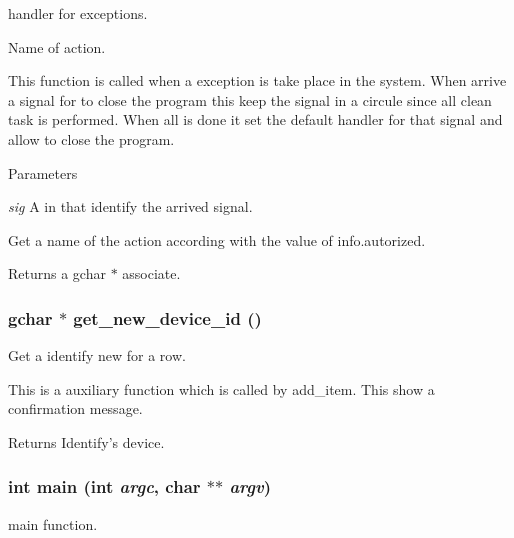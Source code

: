 handler for exceptions. 

Name of action.

This function is called when a exception is take place in the system. When arrive a signal for to close the program this keep the signal in a circule since all clean task is performed. When all is done it set the default handler for that signal and allow to close the program. 
\begin{DoxyParams}{Parameters}
\item[{\em sig}]A in that identify the arrived signal.\end{DoxyParams}
Get a name of the action according with the value of info.autorized. \begin{DoxyReturn}{Returns}
a gchar $\ast$ associate. 
\end{DoxyReturn}
\hypertarget{usb-gui_8c_a4cc20d1f244d51683a95232429734aca}{
\subsubsection[{get\_\-new\_\-device\_\-id}]{\setlength{\rightskip}{0pt plus 5cm}gchar $\ast$ get\_\-new\_\-device\_\-id ()}}
\label{usb-gui_8c_a4cc20d1f244d51683a95232429734aca}


Get a identify new for a row. 

This is a auxiliary function which is called by add\_\-item. This show a confirmation message. \begin{DoxyReturn}{Returns}
Identify's device. 
\end{DoxyReturn}
\hypertarget{usb-gui_8c_a3c04138a5bfe5d72780bb7e82a18e627}{
\subsubsection[{main}]{\setlength{\rightskip}{0pt plus 5cm}int main (int {\em argc}, \/  char $\ast$$\ast$ {\em argv})}}
\label{usb-gui_8c_a3c04138a5bfe5d72780bb7e82a18e627}


main function. 

